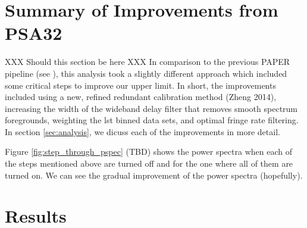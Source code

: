 \documentclass[twocolumn,numberedappendix]{emulateapj}
\begin{document}
\section{Summary of Improvements from PSA32}
XXX Should this section be here XXX
In comparison to the previous PAPER pipeline (see \cite{parsons_et_al2014a}),
this analysis took a slightly different approach which included some critical
steps to improve our upper limit. In short, the improvements included using a
new, refined redundant calibration method (Zheng 2014), increasing the width of
the wideband delay filter that removes smooth spectrum foregrounds, weighting
the lst binned data sets, and optimal fringe rate filtering. In section
\ref{sec:analysis}, we dicuss each of the improvements in more detail.

Figure \ref{fig:step_through_pspec} (TBD) shows the power spectra when each of
the steps mentioned above are turned off and for the one where all of them are
turned on. We can see the gradual improvement of the power spectra (hopefully).






\section{Results}
%
%
\end{document}
